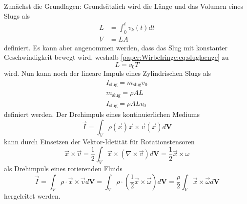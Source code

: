 Zunächst die Grundlagen:
Grundsätzlich wird die Länge und das Volumen eines Slugs als
\begin{align}
    L &= \int_{0}^{t}v_k(t)dt\\
    \label{paper:Wirbelringe:eq:sluglaenge}
    V &= LA
\end{align}
definiert.
Es kann aber angenommen werden, dass das Slug mit konstanter Geschwindigkeit bewegt wird, weshalb \ref{paper:Wirbelringe:eq:sluglaenge} zu
\begin{equation}
    L = v_0T
\end{equation}
wird.
Nun kann noch der lineare Impuls eines Zylindrischen Slugs als
\begin{align}
    I_{\text{slug}} = m_{\text{slug}}v_0\\
    m_{\text{slug}} = \rho AL\\
    I_{\text{slug}} = \rho ALv_0
    \label{paper:Wirbelringe:eq:slugImp}
\end{align}
definiert werden.
Der Drehimpuls eines kontinuierlichen Mediums
\begin{equation}
    \vec{I} = \int_{V}\rho(\vec{x})\vec{x}\times\vec{v}(\vec{x})d\mathbf{V}
\end{equation}
kann durch Einsetzen der Vektor-Idetität für Rotationstensoren \cite{Wirbelringe:batchelor1967}
\begin{equation}
    \vec{x}\times\vec{v} = \frac{1}{2}\int_{V}\vec{x}\times(\nabla\times\vec{v})d\mathbf{V} = \frac{1}{2}\vec{x}\times\omega
\end{equation}
als Drehimpuls eines rotierenden Fluids 
\begin{equation}
    \vec{I} = \int_{V}\rho\cdot\vec{x}\times\vec{v}d\mathbf{V} = \int_{V}\rho\cdot(\frac{1}{2}\vec{x}\times\vec{\omega})d\mathbf{V} = \frac{\rho}{2}\int_{V}\vec{x}\times\vec{\omega}d\mathbf{V}
    \label{paper:Wirbelringe:eq:Drehimpuls}
\end{equation}
hergeleitet werden. 

